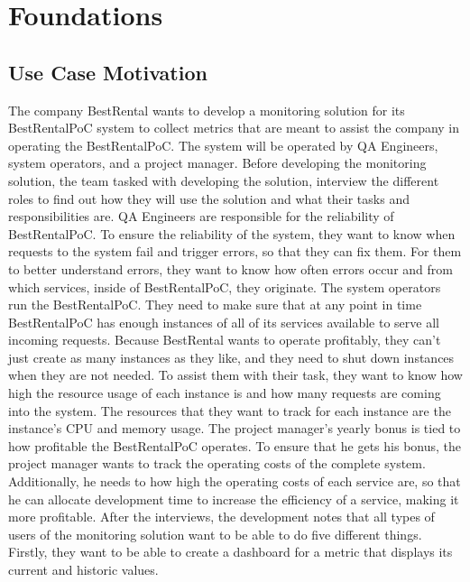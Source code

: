 \chapter{Foundations}
\label{cha:foundations}



\section{Use Case Motivation}

The company BestRental wants to develop a monitoring solution for its BestRentalPoC system
to collect metrics that are meant to assist the company in operating the BestRentalPoC.
The system will be operated by QA Engineers, system operators, and a project manager.
Before developing the monitoring solution, the team tasked with developing the solution,
interview the different roles to find out how they will use the solution
and what their tasks and responsibilities are.
QA Engineers are responsible for the reliability of BestRentalPoC.
To ensure the reliability of the system, they want to know when requests to the system fail and
trigger errors, so that they can fix them.
For them to better understand errors, they want to know how often errors occur and from which services,
inside of BestRentalPoC, they originate.
The system operators run the BestRentalPoC. They need to make sure that at any point in time
BestRentalPoC has enough instances of all of its services available to serve all incoming requests.
Because BestRental wants to operate profitably, they can't just create as many instances as they like,
and they need to shut down instances when they are not needed.
To assist them with their task, they want to know how high the resource usage of each instance is
and how many requests are coming into the system. The resources that they want to track for each
instance are the instance's CPU and memory usage.
The project manager's yearly bonus is tied to how profitable the BestRentalPoC operates.
To ensure that he gets his bonus, the project manager wants to track the operating costs of the complete system.
Additionally, he needs to how high the operating costs of each service are, so that he can
allocate development time to increase the efficiency of a service, making it more profitable.
After the interviews, the development notes that all types of users of the monitoring solution
want to be able to do five different things.
Firstly, they want to be able to create a dashboard for a metric that displays its current and historic values.
